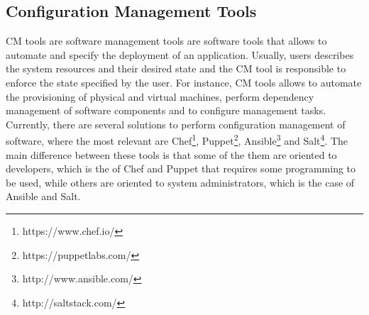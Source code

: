 \subsection{Configuration Management Tools}
\label{sub:cm_tools}
\gls{CM} tools are software management tools are software tools that allows to automate and specify
the deployment of an application. Usually, users describes the system resources and their desired
state and the \gls{CM} tool is responsible to enforce the state specified by the user.
For instance, \gls{CM} tools allows to automate the provisioning of physical and virtual machines,
perform dependency management of software components and to configure management tasks.\\

Currently, there are several solutions to perform configuration management of software, where the
most relevant are Chef\footnote{https://www.chef.io/}, Puppet\footnote{https://puppetlabs.com/},
Ansible\footnote{http://www.ansible.com/} and Salt\footnote{http://saltstack.com/}. The main difference
between these tools is that some of the them are oriented to developers, which is the of Chef and Puppet
that requires some programming to be used, while others are oriented to system administrators, which
is the case of Ansible and Salt.  
